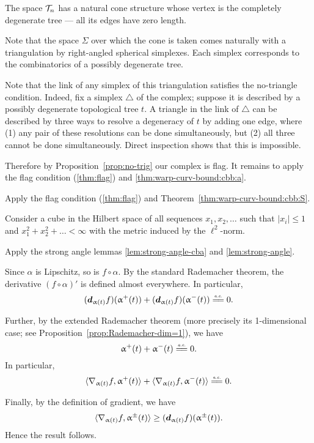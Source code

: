 The space $\mathcal{T}_n$ has a natural cone structure whose vertex is the  completely degenerate tree --- all its edges have zero length.

Note that the space $\Sigma$
over which the cone is taken comes naturally with a triangulation 
by right-angled spherical simplexes.
Each simplex corresponds to the combinatorics of a possibly degenerate tree.

Note that the link of any simplex of this triangulation satisfies the no-triangle condition.
Indeed, fix a simplex $\triangle$ of the complex;
suppose it is described by a possibly degenerate topological tree $t$.
A triangle in the link of  $\triangle$ can be described by three ways to resolve a degeneracy of $t$ by adding one edge, where 
(1) any pair of these resolutions can be done simultaneously, but (2) all three cannot be done simultaneously.
Direct inspection shows that this is impossible.

Therefore by Proposition~\ref{prop:no-trig} our complex is flag.
It remains to apply the flag condition (\ref{thm:flag}) and \ref{thm:warp-curv-bound:cbb:a}.

Apply the flag condition (\ref{thm:flag}) and Theorem~\ref{thm:warp-curv-bound:cbb:S}.

Consider a cube in the Hilbert space
of all sequences $x_1,x_2,\dots$ such that $|x_i|\le 1$ and $x_1^2+x_2^2+\dots<\infty$ with the metric induced by the $\ell^2$-norm.

 Apply the strong angle lemmas
\ref{lem:strong-angle-cba}
and \ref{lem:strong-angle}.


Since $\alpha$ is Lipschitz, so is $f\circ\alpha$.
By the standard Rademacher theorem, the derivative $(f\circ\alpha)'$ is defined almost everywhere.
In particular, 
\[(\dd_{\alpha(t)}f)(\alpha^+(t))+(\dd_{\alpha(t)}f)(\alpha^-(t))\ae0.\]

Further, by the extended Rademacher theorem (more precisely its 1-dimensional case; see Proposition~\ref{prop:Rademacher-dim=1}),
we have 
\[\alpha^+(t)+\alpha^-(t)\ae0.\]
In particular,
\[\<\nabla_{\alpha(t)}f,\alpha^+(t)\>+\<\nabla_{\alpha(t)}f,\alpha^-(t)\>
\ae0.\]

Finally, by the definition of gradient, we have 
\[\<\nabla_{\alpha(t)}f,\alpha^\pm(t)\>\ge (\dd_{\alpha(t)}f)(\alpha^\pm(t)).\]
Hence the result follows.

